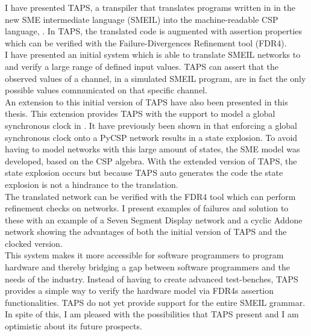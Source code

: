 I have presented TAPS, a transpiler that translates programs written in in the
new SME intermediate language (SMEIL) into the machine-readable CSP language,
\cspm{}. In TAPS, the translated \cspm{} code is augmented with assertion
properties which can be verified with the Failure-Divergences Refinement tool
(FDR4).\\
I have presented an initial system which is able to translate SMEIL networks to
\cspm{} and verify a large range of defined input values. TAPS can assert that
the observed values of a channel, in a simulated SMEIL program, are in fact the
only possible values communicated on that specific channel. \\

An extension to this initial version of TAPS have also been presented in this
thesis. This extension provides TAPS with the support to model a global
synchronous clock in \cspm{}. It have previously been shown in \cite{Skaarup14}
that enforcing a global synchronous clock onto a PyCSP network results in a
state explosion. To avoid having to model networks with this large amount of
states, the SME model was developed, based on the CSP algebra. With the
extended version of TAPS, the state explosion occurs but because TAPS auto
generates the \cspm{} code the state explosion is not a hindrance to the
translation.\\

The translated \cspm{} network can be verified with the FDR4 tool which can
perform refinement checks on \cspm{} networks. I present examples of failures
and solution to these with an example of a Seven Segment Display network and a
cyclic Addone network showing the advantages of both the initial version of TAPS and the clocked version.\\

This system makes it more accessible for software programmers to program
hardware and thereby bridging a gap between software programmers and the needs
of the industry.
Instead of having to create advanced test-benches, TAPS provides a simple
way to verify the hardware model via FDR4s assertion functionalities.
TAPS do not yet provide support for the entire SMEIL grammar. In spite of this,
I am pleased with the possibilities that TAPS present and I am optimistic about its future prospects.



